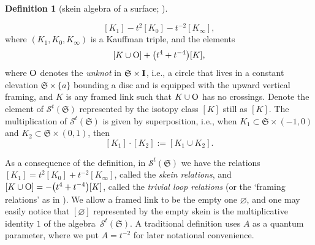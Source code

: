 \documentclass[pdftex]{sigma}
\numberwithin{equation}{section}
\theoremstyle{definition}
\newtheorem{Definition}[Theorem]{Definition}
\begin{document}
\begin{Definition}[skein algebra of a surface; \cite{Pr, Turaev}]
\begin{enumerate}[label={\rm (SA\arabic*)}]
\[
[K_1] - t^2 [K_0] - t^{-2} [K_\infty],
\]
where $(K_1,K_0,K_\infty)$ is a Kauffman triple, and the elements
\[
[K \cup {\rm O}] + \bigl(t^4+t^{-4}\bigr) [K],
\]
where ${\rm O}$ denotes the {\em unknot} in $\mathfrak{S} \times {\bf I}$, i.e., a circle that lives in a constant elevation $\mathfrak{S} \times \{ a\}$ bounding a disc and is equipped with the upward vertical framing, and $K$ is any framed link such that $K \cup {\rm O}$ has no crossings.
Denote the element of $\mathcal{S}^t(\mathfrak{S})$ represented by the isotopy class $[K]$ still as $[K]$.
The multiplication of $\mathcal{S}^t(\mathfrak{S})$ is given by superposition, i.e., when $K_1 \subset \mathfrak{S} \times (-1,0)$ and $K_2 \subset \mathfrak{S} \times (0,1)$, then
\[
[K_1] \cdot [K_2] := [K_1 \cup K_2].
\]
\end{enumerate}
\end{Definition}
As a consequence of the definition, in $\mathcal{S}^t(\mathfrak{S})$ we have the relations $[K_1] = t^2 [K_0] + t^{-2} [K_\infty]$, called the {\em skein relations}, and $[K\cup {\rm O}] = - \bigl(t^4+t^{-4}\bigr) [K]$, called the {\em trivial loop relations} (or the `framing relations' as in \cite{Bullock}). We allow a framed link to be the empty one $\varnothing$, and one may easily notice that $[{\varnothing}]$ represented by the empty skein is the multiplicative identity $1$ of the algebra~$\mathcal{S}^t(\mathfrak{S})$. A traditional definition uses $A$ as a quantum parameter, where we put $A = t^{-2}$ for later notational convenience.
\end{document}
